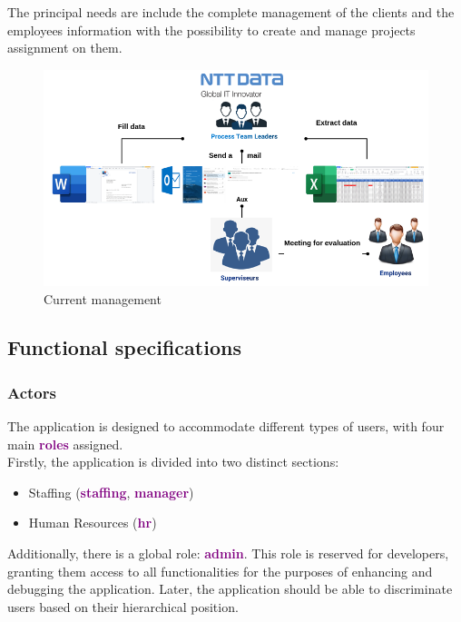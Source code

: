 \documentclass[12pt,a4paper,table,english]{article}
\begin{document}
	The principal needs are include the complete management of the clients and the employees information with the possibility to create and manage projects assignment on them.
	
	\begin{figure}[h!]
		\centering
		\includegraphics[width=0.65\linewidth]{Image/current_app.png}
		\caption{Current management}
		\label{fig:Current management}
	\end{figure}


	\subsection{Functional specifications}
	\subsubsection{Actors}
	The application is designed to accommodate different types of users, with four main \textcolor{purple}{\textbf{roles}} assigned.\\
	Firstly, the application is divided into two distinct sections:\\
	
	\begin{itemize}
		\item Staffing (\textcolor{purple}{\textbf{staffing}}, \textcolor{purple}{\textbf{manager}})
		\item Human Resources (\textcolor{purple}{\textbf{hr}})
	\end{itemize}

	\noindent Additionally, there is a global role: \textcolor{purple}{\textbf{admin}}. This role is reserved for developers, granting them access to all functionalities for the purposes of enhancing and debugging the application.
	Later, the application should be able to discriminate users based on their hierarchical position.
	\pagebreak
	
\end{document}
